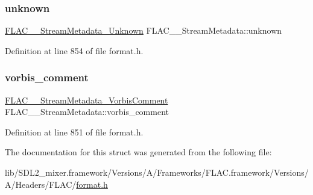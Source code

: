 \mbox{\label{struct_f_l_a_c_____stream_metadata_ac29528515ea884b108a813a6609515bd}} 
\subsubsection{\texorpdfstring{unknown}{unknown}}
{\footnotesize\ttfamily \mbox{\hyperlink{struct_f_l_a_c_____stream_metadata___unknown}{F\+L\+A\+C\+\_\+\+\_\+\+Stream\+Metadata\+\_\+\+Unknown}} F\+L\+A\+C\+\_\+\+\_\+\+Stream\+Metadata\+::unknown}



Definition at line 854 of file format.\+h.

\mbox{\label{struct_f_l_a_c_____stream_metadata_a02662cb0ff19e8229dcd2384f708bae0}} 
\subsubsection{\texorpdfstring{vorbis\_comment}{vorbis\_comment}}
{\footnotesize\ttfamily \mbox{\hyperlink{struct_f_l_a_c_____stream_metadata___vorbis_comment}{F\+L\+A\+C\+\_\+\+\_\+\+Stream\+Metadata\+\_\+\+Vorbis\+Comment}} F\+L\+A\+C\+\_\+\+\_\+\+Stream\+Metadata\+::vorbis\+\_\+comment}



Definition at line 851 of file format.\+h.



The documentation for this struct was generated from the following file\+:\begin{DoxyCompactItemize}
\item 
lib/\+S\+D\+L2\+\_\+mixer.\+framework/\+Versions/\+A/\+Frameworks/\+F\+L\+A\+C.\+framework/\+Versions/\+A/\+Headers/\+F\+L\+A\+C/\mbox{\hyperlink{format_8h}{format.\+h}}\end{DoxyCompactItemize}
